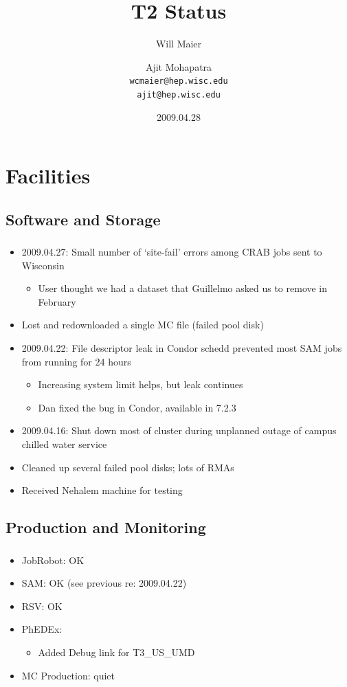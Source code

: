 \documentclass{beamer}
\title{T2 Status}
\author[Maier, Mohapatra]{
    Will Maier \and Ajit Mohapatra\\ 
    {\tt wcmaier@hep.wisc.edu}\\
    {\tt ajit@hep.wisc.edu}}
\institute[Wisconsin]{University of Wisconsin - High Energy Physics}
\date{2009.04.28}
\begin{document}
\begin{frame}
    \titlepage
\end{frame}


\section{Facilities}
\subsection{Software and Storage}
\begin{frame}
\frametitle{}
\begin{itemize}
	\item 2009.04.27: Small number of `site-fail' errors among CRAB jobs sent to Wisconsin
	\begin{itemize}
		\item User thought we had a dataset that Guillelmo asked us to remove in February
	\end{itemize}
	\item Lost and redownloaded a single MC file (failed pool disk)
	\item 2009.04.22: File descriptor leak in Condor schedd prevented most SAM jobs from running for 24 hours
	\begin{itemize}
		\item Increasing system limit helps, but leak continues
		\item Dan fixed the bug in Condor, available in 7.2.3
	\end{itemize}
	\item 2009.04.16: Shut down most of cluster during unplanned outage of campus chilled water service
	\item Cleaned up several failed pool disks; lots of RMAs
	\item Received Nehalem machine for testing
\end{itemize}
\end{frame}

\subsection{Production and Monitoring}
\begin{frame}
\frametitle{}
\begin{itemize}
     \item JobRobot: OK
     \item SAM: OK (see previous re: 2009.04.22)
     \item RSV: OK
     \item PhEDEx:
	 \begin{itemize}
		\item Added Debug link for T3\_US\_UMD
	 \end{itemize}
     \item MC Production: quiet
\end{itemize}
\end{frame}
\end{document}
